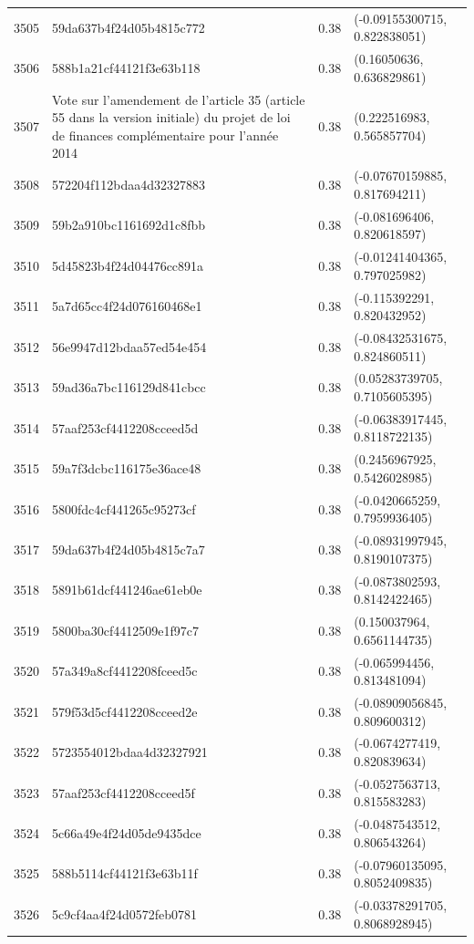 \begin{table}[ht]
\begin{tabular}{rlrl}
  3505 & 59da637b4f24d05b4815c772 & 0.38 & (-0.09155300715, 0.822838051) \\ 
  3506 & 588b1a21cf44121f3e63b118 & 0.38 & (0.16050636, 0.636829861) \\ 
  3507 & Vote sur l'amendement de l'article 35 (article 55 dans la version initiale) du projet de loi de finances complémentaire pour l'année 2014 & 0.38 & (0.222516983, 0.565857704) \\ 
  3508 & 572204f112bdaa4d32327883 & 0.38 & (-0.07670159885, 0.817694211) \\ 
  3509 & 59b2a910bc1161692d1c8fbb & 0.38 & (-0.081696406, 0.820618597) \\ 
  3510 & 5d45823b4f24d04476cc891a & 0.38 & (-0.01241404365, 0.797025982) \\ 
  3511 & 5a7d65cc4f24d076160468e1 & 0.38 & (-0.115392291, 0.820432952) \\ 
  3512 & 56e9947d12bdaa57ed54e454 & 0.38 & (-0.08432531675, 0.824860511) \\ 
  3513 & 59ad36a7bc116129d841cbcc & 0.38 & (0.05283739705, 0.7105605395) \\ 
  3514 & 57aaf253cf4412208cceed5d & 0.38 & (-0.06383917445, 0.8118722135) \\ 
  3515 & 59a7f3dcbc116175e36ace48 & 0.38 & (0.2456967925, 0.5426028985) \\ 
  3516 & 5800fdc4cf441265c95273cf & 0.38 & (-0.0420665259, 0.7959936405) \\ 
  3517 & 59da637b4f24d05b4815c7a7 & 0.38 & (-0.08931997945, 0.8190107375) \\ 
  3518 & 5891b61dcf441246ae61eb0e & 0.38 & (-0.0873802593, 0.8142422465) \\ 
  3519 & 5800ba30cf4412509e1f97c7 & 0.38 & (0.150037964, 0.6561144735) \\ 
  3520 & 57a349a8cf4412208fceed5c & 0.38 & (-0.065994456, 0.813481094) \\ 
  3521 & 579f53d5cf4412208cceed2e & 0.38 & (-0.08909056845, 0.809600312) \\ 
  3522 & 5723554012bdaa4d32327921 & 0.38 & (-0.0674277419, 0.820839634) \\ 
  3523 & 57aaf253cf4412208cceed5f & 0.38 & (-0.0527563713, 0.815583283) \\ 
  3524 & 5c66a49e4f24d05de9435dce & 0.38 & (-0.0487543512, 0.806543264) \\ 
  3525 & 588b5114cf44121f3e63b11f & 0.38 & (-0.07960135095, 0.8052409835) \\ 
  3526 & 5c9cf4aa4f24d0572feb0781 & 0.38 & (-0.03378291705, 0.8068928945) \\ 

\end{tabular}
\end{table}

